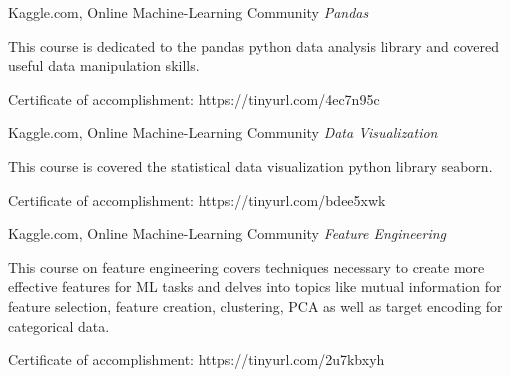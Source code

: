 \begin{cventries}
  \cventry
  {Kaggle.com, Online Machine-Learning Community} %
  {\textit{Pandas}}
  {} %
  {} %
  {
    \begin{cvitems} %
      \item {This course is dedicated to the pandas python data analysis library and covered useful data manipulation skills.}
      \item {Certificate of accomplishment: https://tinyurl.com/4ec7n95c}
    \end{cvitems}
  }
  \newline

\cventry
{Kaggle.com, Online Machine-Learning Community} %
{\textit{Data Visualization}}
{} %
{} %
{
  \begin{cvitems} %
    \item {This course is covered the statistical data visualization python library seaborn.}
    \item {Certificate of accomplishment: https://tinyurl.com/bdee5xwk}
  \end{cvitems}
}
\newline

\cventry
{Kaggle.com, Online Machine-Learning Community} %
{\textit{Feature Engineering}}
{} %
{} %
{
  \begin{cvitems} %
    \item {This course on feature engineering covers techniques necessary to create more effective features for ML tasks and delves into topics like mutual information for feature selection, feature creation, clustering, PCA as well as target encoding for categorical data.}
    \item {Certificate of accomplishment: https://tinyurl.com/2u7kbxyh}
  \end{cvitems}
}
\newline


\end{cventries}
